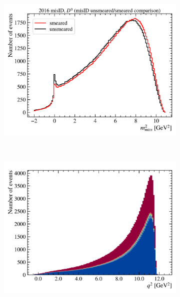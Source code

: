 \begin{figure}[!htb]
\begin{subfigure}[b]{0.32\textwidth}
    \end{subfigure}
    \hfill
    \begin{subfigure}[b]{0.32\textwidth}
        \centering
        \includegraphics[width=\textwidth]{figs-fit-fit-templates/data-driven-plots/misid/D0_mm2_comp.pdf}
    \end{subfigure}
    \\
    \begin{subfigure}[b]{0.32\textwidth}
        \centering
        \includegraphics[width=\textwidth]{figs-fit-fit-templates/data-driven-plots/misid/D0_q2.pdf}
    \end{subfigure}
    \hfill
    \begin{subfigure}[b]{0.32\textwidth}

\end{subfigure}
\end{figure}
